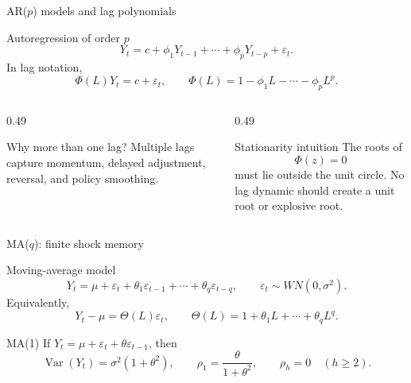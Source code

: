 \documentclass[10pt]{beamer}
\DeclareMathOperator{\Var}{Var}
\newcommand{\eps}{\varepsilon}
\begin{document}
\begin{frame}{AR($p$) models and lag polynomials}
\label{slide:arp_roots}
\small
\begin{block}{Autoregression of order $p$}
\[
Y_t=c+\phi_1Y_{t-1}+\cdots+\phi_pY_{t-p}+\eps_t.
\]
In lag notation,
\[
\Phi(L)Y_t=c+\eps_t,
\qquad
\Phi(L)=1-\phi_1L-\cdots-\phi_pL^p.
\]
\end{block}

\pause
\begin{columns}[T]
\begin{column}{0.49\textwidth}
\begin{exampleblock}{Why more than one lag?}
Multiple lags capture momentum, delayed adjustment, reversal, and policy smoothing.
\end{exampleblock}
\end{column}
\begin{column}{0.49\textwidth}
\begin{alertblock}{Stationarity intuition}
The roots of
\[
\Phi(z)=0
\]
must lie outside the unit circle. No lag dynamic should create a unit root or explosive root.
\end{alertblock}
\end{column}
\end{columns}

\hfill\hyperlink{app:arp-roots}{}
\end{frame}

\begin{frame}{MA($q$): finite shock memory}
\small
\begin{block}{Moving-average model}
\[
Y_t=\mu+\eps_t+\theta_1\eps_{t-1}+\cdots+\theta_q\eps_{t-q},
\qquad
\eps_t\sim WN(0,\sigma^2).
\]
Equivalently,
\[
Y_t-\mu=\Theta(L)\eps_t,
\qquad
\Theta(L)=1+\theta_1L+\cdots+\theta_qL^q.
\]
\end{block}

\pause
\begin{exampleblock}{MA(1)}
If $Y_t=\mu+\eps_t+\theta\eps_{t-1}$, then
\[
\Var(Y_t)=\sigma^2(1+\theta^2),
\qquad
\rho_1=\frac{\theta}{1+\theta^2},
\qquad
\rho_h=0\quad(h\geq 2).
\]
\end{exampleblock}
\end{frame}
\end{document}
